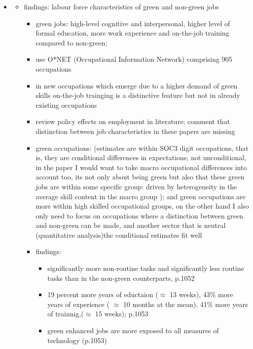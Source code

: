 \begin{itemize}
	\item \cite{Consoli2016DoCapital}
	\begin{itemize}
		\item findings: labour force characteristics of green and non-green jobs
		\begin{itemize}
			\item green jobs: high-level cognitive and interpersonal, higher level of formal education, more work experience and on-the-job training compared to non-green; 
			\item use O*NET (Occupational Information Network) comprising 905 occupations
			\item in new occupations which emerge due to a higher demand of green skills on-the-job trainging is a distinctive feature but not in already existing occupations
			\item review policy effects on employment in literature; comment that distinction between job characteristics in these papers are missing
			\item green occupations: (estimates are within SOC3 digit occupations, that is, they are conditional differences in expectations; not unconditional, in the paper I would want to take macro occupational differences into account too, its not only about being green but also that these green jobs are within some specific group: driven by heterogeneity in the average skill content in the macro group ); and green occupations are more within high skilled occupational groups, on the other hand I also only need to focus on occupations where a distinction between green and non-green can be made, and another sector that is neutral (quantitative analysis)\ar the conditional estimates fit well
			\item findings:
			\begin{itemize}
				\item 
				significantly more non-routine tasks and significantly less routine tasks than in the non-green counterparts, p.1052
				\item 19 percent more years of eductaion ($\approx$ 13 weeks), 43\% more years of experience ( $\approx$ 10 months at the mean), 41\% more years of trainnig,($\approx$ 15 weeks); p.1053
				\item green enhanced jobs are more exposed to all measures of technology (p.1053) 
			\end{itemize}
		\end{itemize}
	\end{itemize}
\end{itemize}

